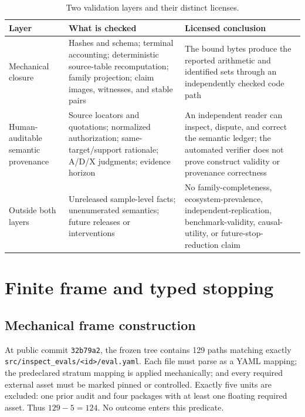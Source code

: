 \begin{table}[ht]
\centering
\caption{Two validation layers and their distinct licenses.}
\label{tab:validation-boundary}
\footnotesize
\begin{tabularx}{\linewidth}{@{}p{.20\linewidth}p{.34\linewidth}Y@{}}
\toprule Layer & What is checked & Licensed conclusion \\
\midrule
Mechanical closure & Hashes and schema; terminal accounting; deterministic source-table recomputation; family projection; claim images, witnesses, and stable pairs & The bound bytes produce the reported arithmetic and identified sets through an independently checked code path \\
Human-auditable semantic provenance & Source locators and quotations; normalized authorization; same-target/support rationale; A/D/X judgments; evidence horizon & An independent reader can inspect, dispute, and correct the semantic ledger; the automated verifier does not prove construct validity or provenance correctness \\
Outside both layers & Unreleased sample-level facts; unenumerated semantics; future releases or interventions & No family-completeness, ecosystem-prevalence, independent-replication, benchmark-validity, causal-utility, or future-stop-reduction claim \\
\bottomrule
\end{tabularx}
\end{table}

\section{Finite frame and typed stopping}
\label{app:frame-accounting}

\subsection{Mechanical frame construction}
\label{app:frame-predicate}

At public commit \texttt{32b79a2}, the frozen tree contains 129 paths matching exactly \texttt{src/inspect\_evals/<id>/eval.yaml}.  Each file must parse as a YAML mapping; the predeclared stratum mapping is applied mechanically; and every required external asset must be marked pinned or controlled.  Exactly five units are excluded: one prior audit and four packages with at least one floating required asset.  Thus \(129-5=124\).  No outcome enters this predicate.

